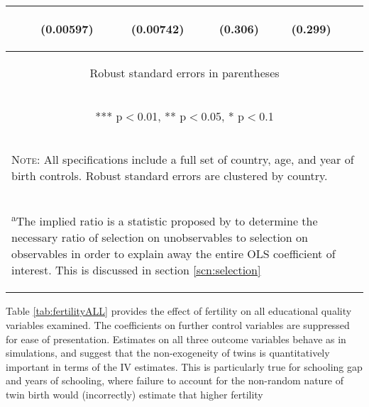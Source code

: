 \documentclass{article}[11pt,subeqn]
\begin{document}
\begin{spacing}{1.25}
\begin{table}[!htbp]
\begin{center}
\begin{tabular}{lccccc}
\vspace{4pt} & \begin{footnotesize}(0.00597)\end{footnotesize} & \begin{footnotesize}(0.00742)\end{footnotesize} & \begin{footnotesize}(0.306)\end{footnotesize} & \begin{footnotesize}(0.299)\end{footnotesize} & \begin{footnotesize}\end{footnotesize} \\
\midrule
\multicolumn{6}{c}{\begin{footnotesize} Robust standard errors in parentheses\end{footnotesize}} \\
\multicolumn{6}{c}{\begin{footnotesize} *** p$<$0.01, ** p$<$0.05, * p$<$0.1\end{footnotesize}} \\
\bottomrule 
\multicolumn{6}{p{12.5cm}}{\setstretch{0.9}\begin{footnotesize}\textsc{Note:} All specifications include a full set of country, age, and year of birth controls. Robust standard errors are clustered by country.\end{footnotesize}}\\
\multicolumn{6}{p{12.5cm}}{\setstretch{0.9}\begin{footnotesize}\textsuperscript{a}The implied ratio is a statistic proposed by \citet{Altonjietal2005} to determine the necessary ratio of selection on unobservables to selection on observables in order to explain away the entire OLS coefficient of interest.  This is discussed in section \ref{scn:selection}  \end{footnotesize}}\\
\end{tabular}
\end{center}
\end{table}
Table \ref{tab:fertilityALL} provides the effect of fertility on all educational quality variables examined.  The coefficients on further control variables are suppressed for ease 
of presentation. Estimates on all three outcome variables behave as in simulations, and suggest that the non-exogeneity of twins is quantitatively important in terms of the IV 
estimates.  This
is particularly true for schooling gap and years of schooling, where failure to account for the non-random nature of twin birth would (incorrectly) estimate that higher fertility 

\end{spacing}
\end{document}
